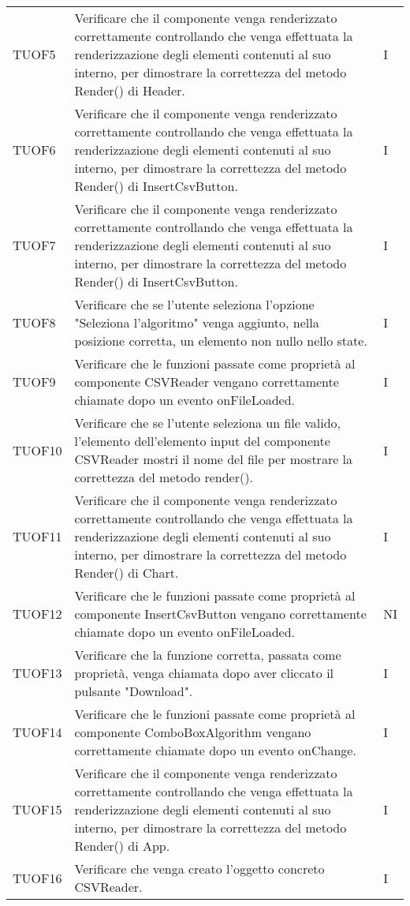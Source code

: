 \begin{longtable}{C{2cm} L{8cm} C{2cm}}
TUOF5 & Verificare che il componente venga renderizzato correttamente controllando che venga effettuata la renderizzazione degli elementi contenuti al suo interno, per dimostrare la correttezza del metodo Render() di Header. & I \\
TUOF6 & Verificare che il componente venga renderizzato correttamente controllando che venga effettuata la renderizzazione degli elementi contenuti al suo interno, per dimostrare la correttezza del metodo Render() di InsertCsvButton. & I \\
TUOF7 & Verificare che il componente venga renderizzato correttamente controllando che venga effettuata la renderizzazione degli elementi contenuti al suo interno, per dimostrare la correttezza del metodo Render() di InsertCsvButton. & I \\
TUOF8 & Verificare che se l’utente seleziona l’opzione "Seleziona l'algoritmo" venga aggiunto, nella posizione corretta, un elemento non nullo nello state. & I \\
TUOF9 & Verificare che le funzioni passate come proprietà al componente CSVReader vengano correttamente chiamate dopo un evento onFileLoaded. & I \\
TUOF10 & Verificare che se l’utente seleziona un file valido, l’elemento dell’elemento input del componente CSVReader mostri il nome del file per mostrare la correttezza del metodo render(). & I\\
TUOF11 & Verificare che il componente venga renderizzato correttamente controllando che venga effettuata la renderizzazione degli elementi contenuti al suo interno, per dimostrare la correttezza del metodo Render() di Chart. & I \\
TUOF12 & Verificare che le funzioni passate come proprietà al componente InsertCsvButton vengano correttamente chiamate dopo un evento onFileLoaded. & NI \\
TUOF13 & Verificare che la funzione corretta, passata come proprietà, venga chiamata dopo aver cliccato il pulsante "Download". & I \\
TUOF14 & Verificare che le funzioni passate come proprietà al componente ComboBoxAlgorithm vengano correttamente chiamate dopo un evento onChange. & I \\
TUOF15 & Verificare che il componente venga renderizzato correttamente controllando che venga effettuata la renderizzazione degli elementi contenuti al suo interno, per dimostrare la correttezza del metodo Render() di App. & I \\
TUOF16 & Verificare che venga creato l’oggetto concreto CSVReader. & I \\

\end{longtable}
